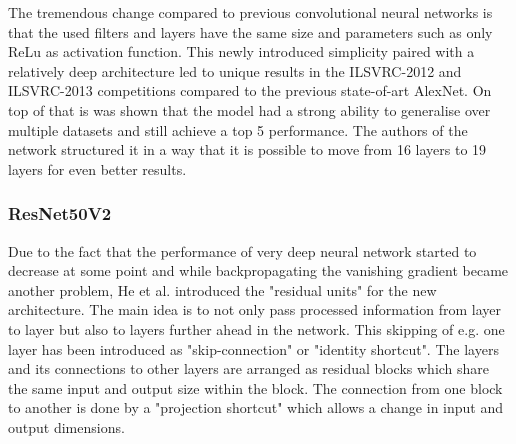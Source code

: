 The tremendous change compared to previous convolutional neural networks is that the used filters and layers have the same size and parameters such as only ReLu as activation function\cite{simonyan2015deep}. This newly introduced simplicity paired with a relatively deep architecture led to unique results in the ILSVRC-2012 and ILSVRC-2013 competitions compared to the previous state-of-art AlexNet. On top of that is was shown that the model had a strong ability to generalise over multiple datasets and still achieve a top 5 performance. The authors of the network structured it in a way that it is possible to move from 16 layers to 19 layers for even better results.

\subsubsection{ResNet50V2}\label{resnet}
Due to the fact that the performance of very deep neural network started to decrease at some point and while backpropagating the vanishing gradient became another problem, He et al. introduced the "residual units" for the new architecture\cite{he2015deep}. The main idea is to not only pass processed information from layer to layer but also to layers further ahead in the network. This skipping of e.g. one layer has been introduced as "skip-connection" or "identity shortcut". The layers and its connections to other layers are arranged as residual blocks which share the same input and output size within the block\cite{he2015deep}. The connection from one block to another is done by a "projection shortcut" which allows a change in input and output dimensions.

